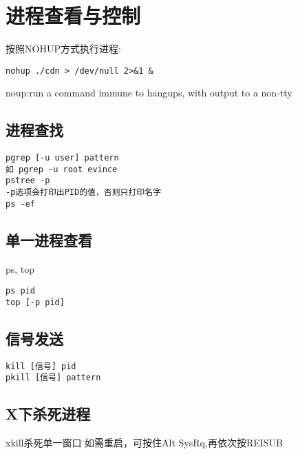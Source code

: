 \section{进程查看与控制}

按照NOHUP方式执行进程:
\begin{verbatim}
nohup ./cdn > /dev/null 2>&1 &
\end{verbatim}
noup:run a command immune to hangups, with output to a non-tty

\subsection{进程查找}
\begin{verbatim}
pgrep [-u user] pattern
如 pgrep -u root evince
pstree -p
-p选项会打印出PID的值，否则只打印名字
ps -ef
\end{verbatim}

\subsection{单一进程查看}
ps, top
\begin{verbatim}
ps pid
top [-p pid]
\end{verbatim}


\subsection{信号发送}
\begin{verbatim}
kill [信号] pid
pkill [信号] pattern
\end{verbatim}

\subsection{X下杀死进程}
xkill杀死单一窗口
如需重启，可按住Alt SysRq,再依次按REISUB


